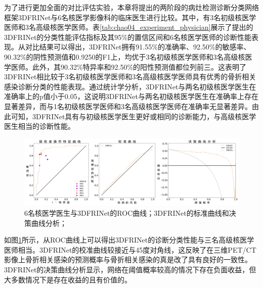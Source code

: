 为了进行更加全面的对比评估实验，本章将提出的两阶段的病灶检测诊断分类网络框架3DFRINet与6名核医学影像科的临床医生进行比较。其中，有3名初级核医学医师和3名高级核医学医师。表\ref{tab:chao04_experiment_physician}展示了提出的3DFRINet的分类性能评估指标及其95\%的置信区间和6名核医学医师的诊断性能表现。从对比结果可以得出，3DFRINet拥有91.55\%的准确率、92.50\%的敏感率、90.32\%的阴性预测值和0.9250的F1上，均优于3名初级核医学医师和3名高级核医学医师。此外，其90.32\%特异率和92.50\%的阳性预测值都位列前三。这表明了3DFRINet相比较于3名初级核医学医师和3名高级核医学医师具有优秀的骨折相关感染诊断分类的性能表现。通过统计学分析，3DFRINet与两名初级核医学医生在准确率上的p值小于0.05，这说明3DFRINet与两名初级核医学医生在准确率上存在显著差异，而与1名初级核医学医师和3名高级核医学医师在准确率无显著差异。由此可知，3DFRINet具有与初级核医学医生更好或相同的诊断能力，与高级核医学医生相当的诊断性能。

\begin{figure}[htbp]
  \centering
  \includegraphics[width=\textwidth]{figures/chap04_eval.jpg}
  \caption{6名核医学医生与3DFRINet的ROC曲线；3DFRINet的标准曲线和决策曲线分析；}
  \label{fig:chap04_eval}
\end{figure}

如图\ref{fig:chap04_eval}所示，从ROC曲线上可以得出3DFRINet的诊断分类性能与三名高级核医学医师相当。3DFRINet的校准曲线较接近与45度对角线，这反映了在三维PET/CT影像上骨折相关感染的预测概率与骨折相关感染的真是改了具有良好的一致性。3DFRINet的决策曲线分析显示，网络在阈值概率较高的情况下存在负面收益，但大多数情况下是存在收益的且有价值的。

